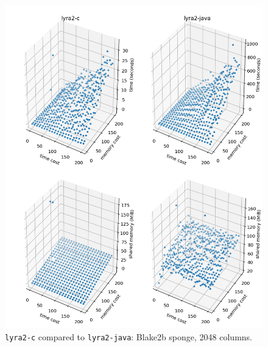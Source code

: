 \begin{figure}[p]
    \centering
    \includegraphics[width=\linewidth,keepaspectratio]{figures/tcost_mcost_blake2b_2048}
    \caption{\texttt{lyra2-c} compared to \texttt{lyra2-java}: Blake2b sponge, 2048 columns.}
    \label{figure:tcost_mcost_blake2b_2048}
\end{figure}

